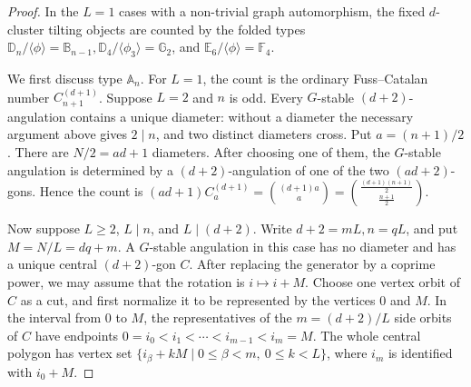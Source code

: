 \documentclass[12pt]{article}
\theoremstyle{plain}
\theoremstyle{definition}
\renewcommand{\leq}{\leqslant}
\renewcommand{\geq}{\geqslant}
\begin{document}
\begin{proof}
In the \(L=1\) cases with a non-trivial graph automorphism, the fixed
\(d\)-cluster tilting objects are counted by the folded types
\(
\mathbb D_n/\langle\phi\rangle=\mathbb B_{n-1},
\mathbb D_4/\langle\phi_3\rangle=\mathbb G_2\), and \(\mathbb E_6/\langle\phi\rangle=\mathbb F_4.
\)

We first discuss type \(\mathbb A_n\).  For \(L=1\), the count is the ordinary
Fuss--Catalan number \(C_{n+1}^{(d+1)}\).  Suppose \(L=2\) and \(n\) is odd.
Every \(G\)-stable \((d+2)\)-angulation contains a unique diameter: without a
diameter the necessary argument above gives \(2\mid n\), and two distinct
diameters cross.
Put \(a=(n+1)/2\).  There are \(N/2=ad+1\) diameters.  After choosing one of
them, the \(G\)-stable angulation is determined by a \((d+2)\)-angulation of one
of the two \((ad+2)\)-gons.  Hence the count is
\((ad+1)C_a^{(d+1)} = \binom{(d+1)a}{a} = \binom{\frac{(d+1)(n+1)}2}{\frac{n+1}2}.\)

Now suppose \(L\geq2\), \(L\mid n\), and \(L\mid(d+2)\).  Write
\(d+2=mL, n=qL\), 
and put \(M=N/L=dq+m\).  A \(G\)-stable angulation in this case has no diameter
and has a unique central \((d+2)\)-gon \(C\).  After replacing the generator by
a coprime power, we may assume that the rotation is \(i\mapsto i+M\).  Choose
one vertex orbit of \(C\) as a cut, and first normalize it to be represented by
the vertices \(0\) and \(M\).  In the interval from \(0\) to \(M\), the
representatives of the \(m=(d+2)/L\) side orbits of \(C\) have endpoints
\(0=i_0<i_1<\cdots<i_{m-1}<i_m=M\).  The whole central polygon has vertex set
\(\{i_\beta+kM\mid 0\leq\beta<m,\ 0\leq k<L\}\), where \(i_m\) is identified
with \(i_0+M\).


\end{proof}
\end{document}
